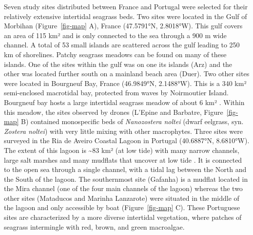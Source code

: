 \documentclass[
  number]{elsarticle}
\begin{document}
Seven study sites distributed between France and Portugal were selected
for their relatively extensive intertidal seagrass beds. Two sites were
located in the Gulf of Morbihan (Figure~\ref{fig-map} A), France
(47.5791°N, 2.8018°W). This gulf covers an area of 115 km² and is only
connected to the sea through a 900 m wide channel. A total of 53 small
islands are scattered across the gulf leading to 250 km of shorelines.
Patchy seagrass meadows can be found on many of these islands. One of
the sites within the gulf was on one its islands (Arz) and the other was
located further south on a mainland beach area (Duer). Two other sites
were located in Bourgneuf Bay, France (46.9849°N, 2.1488°W). This is a
340 km² semi-enclosed macrotidal bay, protected from waves by
Noirmoutier Island. Bourgneuf bay hosts a large intertidal seagrass
meadow of about 6 km² \citep{ZOFFOLI2020112020}. Within this meadow, the
sites observed by drones (L'Epine and Barbatre, Figure~\ref{fig-map} B)
contained monospecific beds of \emph{Nanozostera noltei} (dwarf
eelgrass, syn. \emph{Zostera noltei}) with very little mixing with other
macrophytes. Three sites were surveyed in the Ria de Aveiro Coastal
Lagoon in Portugal (40.6887°N, 8.6810°W). The extent of this lagoon is
\textasciitilde83 km² (at low tide) with many narrow channels, large
salt marshes and many mudflats that uncover at low tide
\citep{sousa2017blue}. It is connected to the open sea through a single
channel, with a tidal lag between the North and the South of the lagoon.
The southernmost site (Gafanha) is a mudflat located in the Mira channel
(one of the four main channels of the lagoon) whereas the two other
sites (Mataducos and Marinha Lanzarote) were situated in the middle of
the lagoon and only accessible by boat (Figure~\ref{fig-map} C). These
Portuguese sites are characterized by a more diverse intertidal
vegetation, where patches of seagrass intermingle with red, brown, and
green macroalgae.
\end{document}
